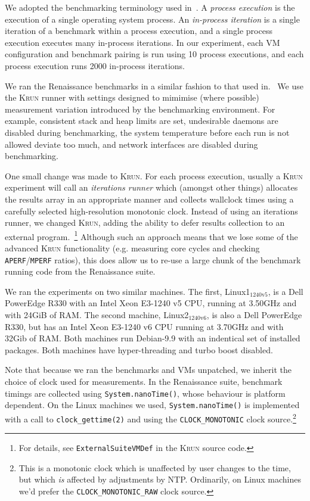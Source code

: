 \documentclass[a4paper]{article}
\newcommand{\krun}{\textsc{Krun}\xspace}
\newcommand{\bencherseven}{Linux1$_\mathrm{1240v5}$\xspace}
\newcommand{\bencherten}{Linux2$_\mathrm{1240v6}$\xspace}
\begin{document}
We adopted the benchmarking terminology used in~\cite{barrett16warmup}. A
\emph{process execution} is the execution of a single operating system process.
An \emph{in-process iteration} is a single iteration of a benchmark within a
process execution, and a single process execution executes many in-process
iterations. In our experiment, each VM configuration and benchmark pairing is
run using 10 process executions, and each process execution runs 2000
in-process iterations.

We ran the Renaissance benchmarks in a similar fashion to that used
in.~\cite{barrett16warmup} We use the \krun runner with
settings designed to mimimise (where possible) measurement variation introduced
by the benchmarking environment. For example, consistent stack and heap limits
are set, undesirable daemons are disabled during benchmarking, the system
temperature before each run is not allowed deviate too much, and network
interfaces are disabled during benchmarking.

One small change was made to \krun. For each process execution, usually a
\krun experiment will call an \emph{iterations runner} which (amongst other
things) allocates the results array in an appropriate manner and collects
wallclock times using a carefully selected high-resolution monotonic clock. Instead
of using an iterations runner, we changed \krun, adding the ability to defer
results collection to an external program.~\footnote{For details, see
\texttt{ExternalSuiteVMDef} in the \krun source code.} Although such an approach
means that we lose some of the advanced \krun functionality (e.g.
measuring core cycles and checking \texttt{APERF}/\texttt{MPERF} ratios), this
does allow us to re-use a large chunk of the benchmark running code from the
Renaissance suite.

We ran the experiments on two similar machines. The first, \bencherseven, is a
Dell PowerEdge R330 with an Intel Xeon E3-1240 v5 CPU, running at 3.50GHz and
with 24GiB of RAM. The second machine, \bencherten, is also a Dell PowerEdge
R330, but has an Intel Xeon E3-1240 v6 CPU running at 3.70GHz
and with 32Gib of RAM. Both machines run Debian-9.9 with an indentical set of
installed packages. Both machines have hyper-threading and turbo boost
disabled.

Note that because we ran the benchmarks and VMs unpatched, we inherit the
choice of clock used for measurements. In the Renaissance suite, benchmark
timings are collected using \texttt{System.nanoTime()}, whose behaviour is
platform dependent. On the Linux machines we used, \texttt{System.nanoTime()}
is implemented with a call to \texttt{clock\_gettime(2)} and using the
\texttt{CLOCK\_MONOTONIC} clock source.\footnote{This is a monotonic clock which
is unaffected by user changes to the time, but which \emph{is} affected by
adjustments by NTP. Ordinarily, on Linux machines we'd prefer the
\texttt{CLOCK\_MONOTONIC\_RAW} clock source.}
\end{document}
